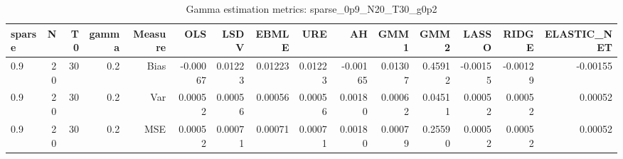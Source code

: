 \begin{table}[!htbp]\centering
\caption{Gamma estimation metrics: sparse_0p9_N20_T30_g0p2}
\label{tab:table1_sparse_0p9_N20_T30_g0p2}
\begin{tabular}{lrrrrrrrrrrrrrr}
\hline
sparse & N & T0 & gamma & Measure & OLS & LSDV & EBMLE & URE & AH & GMM1 & GMM2 & LASSO & RIDGE & ELASTIC_NET \\
\hline
0.9 & 20 & 30 & 0.2 & Bias & -0.00067 & 0.01223 & 0.01223 & 0.01223 & -0.00165 & 0.01307 & 0.45912 & -0.00155 & -0.00129 & -0.00155 \\
0.9 & 20 & 30 & 0.2 & Var & 0.00052 & 0.00056 & 0.00056 & 0.00056 & 0.00180 & 0.00062 & 0.04511 & 0.00052 & 0.00052 & 0.00052 \\
0.9 & 20 & 30 & 0.2 & MSE & 0.00052 & 0.00071 & 0.00071 & 0.00071 & 0.00180 & 0.00079 & 0.25590 & 0.00052 & 0.00052 & 0.00052 \\
\hline
\end{tabular}
\end{table}

